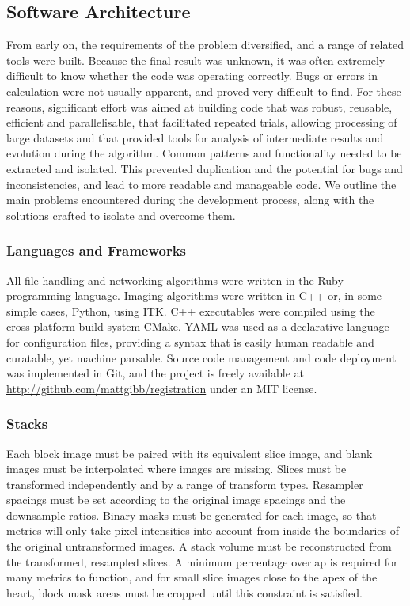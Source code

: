   \subsection{Software Architecture} %
  \label{sub:software_architecture}
		From early on, the requirements of the problem diversified, and a range of related tools were built. Because the final result was unknown, it was often extremely difficult to know whether the code was operating correctly. Bugs or errors in calculation were not usually apparent, and proved very difficult to find. For these reasons, significant effort was aimed at building code that was robust, reusable, efficient and parallelisable, that facilitated repeated trials, allowing processing of large datasets and that provided tools for analysis of intermediate results and evolution during the algorithm. Common patterns and functionality needed to be extracted and isolated. This prevented duplication and the potential for bugs and inconsistencies, and lead to more readable and manageable code. We outline the main problems encountered during the development process, along with the solutions crafted to isolate and overcome them.
		
		\subsubsection{Languages and Frameworks} %
		\label{ssub:languages_and_frameworks}
      All file handling and networking algorithms were written in the Ruby programming language. Imaging algorithms were written in C++ or, in some simple cases, Python, using ITK. C++ executables were compiled using the cross-platform build system CMake. YAML was used as a declarative language for configuration files, providing a syntax that is easily human readable and curatable, yet machine parsable. Source code management and code deployment was implemented in Git, and the project is freely available at \url{http://github.com/mattgibb/registration} under an MIT license.
		
    \subsubsection{Stacks} %
    \label{ssub:stacks}
      Each block image must be paired with its equivalent slice image, and blank images must be interpolated where images are missing. Slices must be transformed independently and by a range of transform types. Resampler spacings must be set according to the original image spacings and the downsample ratios. Binary masks must be generated for each image, so that metrics will only take pixel intensities into account from inside the boundaries of the original untransformed images. A stack volume must be reconstructed from the transformed, resampled slices. A minimum percentage overlap is required for many metrics to function, and for small slice images close to the apex of the heart, block mask areas must be cropped until this constraint is satisfied.
	  	
